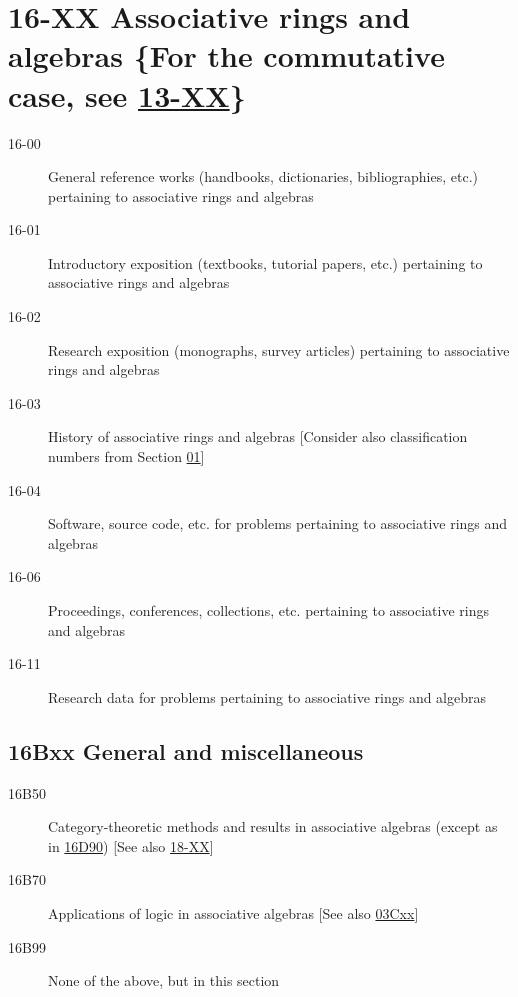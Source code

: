 \section*{16-XX Associative rings and algebras \{For the commutative case, see \hyperref[13-XX]{13-XX}\} }\label{16-XX}
\begin{description}
\item [16-00]\label{16-00} General reference works (handbooks, dictionaries, bibliographies, etc.) pertaining to associative rings and algebras
\item [16-01]\label{16-01} Introductory exposition (textbooks, tutorial papers, etc.) pertaining to associative rings and algebras
\item [16-02]\label{16-02} Research exposition (monographs, survey articles) pertaining to associative rings and algebras
\item [16-03]\label{16-03} History of associative rings and algebras [Consider also classification numbers from Section \hyperref[01-XX]{01}]
\item [16-04]\label{16-04} Software, source code, etc. for problems pertaining to associative rings and algebras
\item [16-06]\label{16-06} Proceedings, conferences, collections, etc. pertaining to associative rings and algebras
\item [16-11]\label{16-11} Research data for problems pertaining to associative rings and algebras
\end{description}
\subsection*{16Bxx  General and miscellaneous }\label{16Bxx}
\begin{description}  
\item [16B50]\label{16B50} Category-theoretic methods and results in associative algebras (except as in \hyperref[16D90]{16D90}) [See also \hyperref[18-XX]{18-XX}]
\item [16B70]\label{16B70} Applications of logic in associative algebras [See also \hyperref[03Cxx]{03Cxx}]
\item [16B99]\label{16B99} None of the above, but in this section
\end{description}
